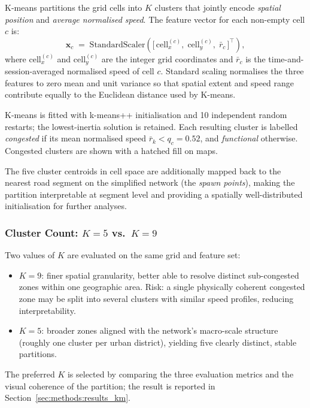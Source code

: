 \documentclass[11pt,a4paper]{article}
\begin{document}
K-means partitions the grid cells
into $K$ clusters that jointly encode \emph{spatial position} and \emph{average
normalised speed}.  The feature vector for each non-empty cell $c$ is:
\begin{equation}
  \mathbf{x}_c \;=\; \mathrm{StandardScaler}\!\left(
    \bigl[\,\mathrm{cell}_x^{(c)},\;\mathrm{cell}_y^{(c)},\;\bar{r}_c\,\bigr]^\top
  \right),
  \label{eq:kmeans_features}
\end{equation}
where $\mathrm{cell}_x^{(c)}$ and $\mathrm{cell}_y^{(c)}$ are the integer grid
coordinates and $\bar{r}_c$ is the time-and-session-averaged normalised speed of
cell $c$.  Standard scaling normalises the three features to zero mean and unit
variance so that spatial extent and speed range contribute equally to the
Euclidean distance used by K-means.

K-means is fitted with k-means++ initialisation and 10 independent random
restarts; the lowest-inertia solution is retained.  Each resulting cluster is
labelled \emph{congested} if its mean normalised speed $\bar{r}_k < q_c = 0.52$,
and \emph{functional} otherwise.  Congested clusters are shown with a hatched fill
on maps.

The five cluster centroids in cell space are additionally mapped back to the
nearest road segment on the simplified network (the \emph{spawn points}), making
the partition interpretable at segment level and providing a spatially
well-distributed initialisation for further analyses.

\subsubsection{Cluster Count: $K = 5$ vs.\ $K = 9$}
\label{sec:methods:kselect}

Two values of $K$ are evaluated on the same grid and feature set:
\begin{itemize}
  \item \textbf{$K = 9$}: finer spatial granularity, better able to resolve
    distinct sub-congested zones within one geographic area.  Risk: a single
    physically coherent congested zone may be split into several clusters with
    similar speed profiles, reducing interpretability.
  \item \textbf{$K = 5$}: broader zones aligned with the network's macro-scale
    structure (roughly one cluster per urban district), yielding five clearly
    distinct, stable partitions.
\end{itemize}
The preferred $K$ is selected by comparing the three evaluation metrics and the
visual coherence of the partition; the result is reported in
Section~\ref{sec:methods:results_km}.
\end{document}
